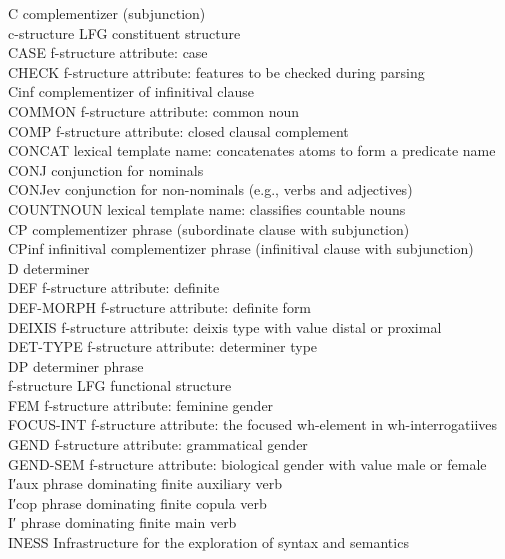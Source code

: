 \documentclass[output=paper]{langsci/langscibook}
\begin{document}
\begin{tabbing}
C \> complementizer (subjunction)\\
c-structure \> LFG constituent structure\\
CASE \> f-structure attribute: case\\
CHECK \> f-structure attribute: features to be checked during parsing\\
Cinf \> complementizer of infinitival clause\\
COMMON \> f-structure attribute: common noun\\
COMP \> f-structure attribute: closed clausal complement\\
CONCAT \> lexical template name: concatenates atoms to form a predicate name\\
CONJ \> conjunction for nominals\\
CONJev \> conjunction for non-nominals (e.g., verbs and adjectives)\\
COUNTNOUN \> lexical template name: classifies countable nouns\\
CP \> complementizer phrase (subordinate clause with subjunction)\\
CPinf \> infinitival complementizer phrase (infinitival clause with subjunction)\\
D \> determiner\\
DEF \> f-structure attribute: definite\\
DEF-MORPH \> f-structure attribute: definite form\\
DEIXIS \> f-structure attribute: deixis type with value distal or proximal\\
DET-TYPE \> f-structure attribute: determiner type\\
DP \> determiner phrase\\
f-structure \> LFG functional structure\\
FEM \> f-structure attribute: feminine gender\\
FOCUS-INT \> f-structure attribute: the focused wh-element in wh-interrogatiives\\
GEND \> f-structure attribute: grammatical gender\\
GEND-SEM \> f-structure attribute: biological gender with value male or female\\
I′aux \> phrase dominating finite auxiliary verb\\
I′cop \> phrase dominating finite copula verb\\
I′ \> phrase dominating finite main verb\\
INESS \> Infrastructure for the exploration of syntax and semantics\\

\end{tabbing}
\end{document}
